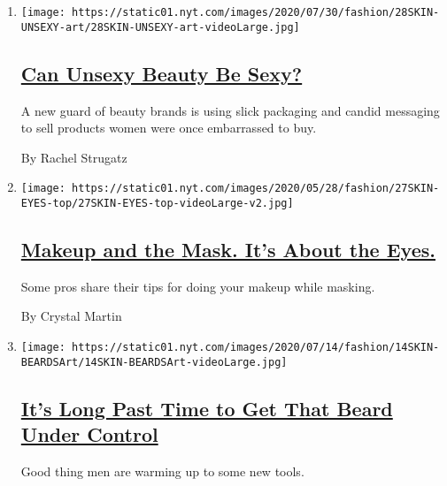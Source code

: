 \begin{enumerate}
\def\labelenumi{\arabic{enumi}.}
\item
  \texttt{[image: https://static01.nyt.com/images/2020/07/30/fashion/28SKIN-UNSEXY-art/28SKIN-UNSEXY-art-videoLarge.jpg]}

  \hypertarget{can-unsexy-beauty-be-sexy-1}{%
  \subsection{\texorpdfstring{\href{/2020/07/28/style/can-unsexy-beauty-be-sexy.html}{Can
  Unsexy Beauty Be
  Sexy?}}{Can Unsexy Beauty Be Sexy?}}\label{can-unsexy-beauty-be-sexy-1}}

  A new guard of beauty brands is using slick packaging and candid
  messaging to sell products women were once embarrassed to buy.

  By Rachel Strugatz
\item
  \texttt{[image: https://static01.nyt.com/images/2020/05/28/fashion/27SKIN-EYES-top/27SKIN-EYES-top-videoLarge-v2.jpg]}

  \hypertarget{makeup-and-the-mask-its-about-the-eyes}{%
  \subsection{\texorpdfstring{\href{/2020/05/26/style/makeup-and-the-mask-its-about-the-eyes.html}{Makeup
  and the Mask. It's About the
  Eyes.}}{Makeup and the Mask. It's About the Eyes.}}\label{makeup-and-the-mask-its-about-the-eyes}}

  Some pros share their tips for doing your makeup while masking.

  By Crystal Martin
\item
  \texttt{[image: https://static01.nyt.com/images/2020/07/14/fashion/14SKIN-BEARDSArt/14SKIN-BEARDSArt-videoLarge.jpg]}

  \hypertarget{its-long-past-time-to-get-that-beard-under-control}{%
  \subsection{\texorpdfstring{\href{/2020/07/15/style/its-long-past-time-to-get-that-beard-under-control.html}{It's
  Long Past Time to Get That Beard Under
  Control}}{It's Long Past Time to Get That Beard Under Control}}\label{its-long-past-time-to-get-that-beard-under-control}}

  Good thing men are warming up to some new tools.


\end{enumerate}
